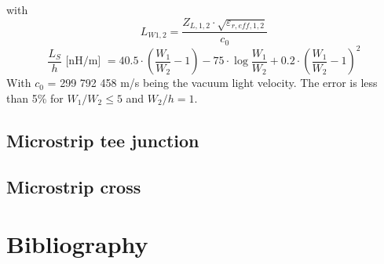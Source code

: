 \documentclass[10pt]{report}
\begin{document}
with
\begin{equation}
L_{W1,2} = \dfrac{Z_{L,1,2}\cdot\sqrt{\varepsilon_{r,eff,1,2}}}{c_0}
\end{equation}
\begin{equation}
\frac{L_S}{h} \textrm{ [nH/m] } = 40.5\cdot\left( \dfrac{W_1}{W_2}-1 \right)
      - 75\cdot\log{\dfrac{W_1}{W_2}} + 0.2\cdot \left( \dfrac{W_1}{W_2}-1 \right)^2
\end{equation}
With $c_0$ = 299 792 458 m/s being the vacuum light velocity.  The
error is less than 5\% for $W_1/W_2\le 5$ and $W_2/h = 1$.

\section{Microstrip tee junction}

\section{Microstrip cross}


\chapter*{Bibliography}
\def\chapter*{}%
\def\section*{}%
\renewcommand{\bibname}{}



\nocite{*}
\end{document}
